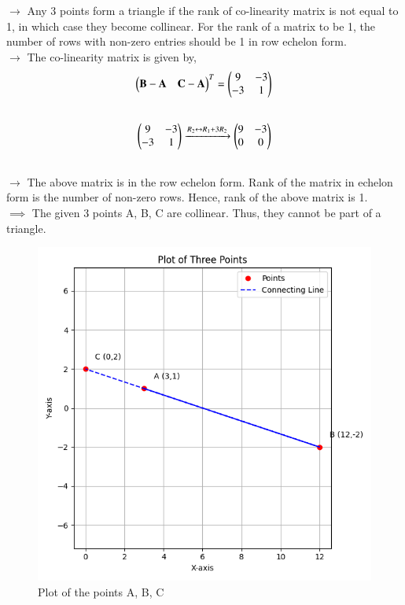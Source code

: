 \documentclass[journal]{IEEEtran}
\begin{document}
$\rightarrow$ Any 3 points form a triangle if the rank of co-linearity matrix is not equal to 1, in which case they become collinear. For the rank of a matrix to be 1, the number of rows with non-zero entries should be 1 in row echelon form. \\
$\rightarrow$ The co-linearity matrix is given by,
\begin{align}
\begin{pmatrix}\mathbf{B}-\mathbf{A} & \mathbf{C}-\mathbf{A}\end{pmatrix}^T = \begin{pmatrix}9 & -3 \\ -3 & 1\end{pmatrix}\\
\notag
\end{align}
\begin{align}
\begin{pmatrix}9 & -3 \\ -3 & 1\end{pmatrix}
&\xrightarrow{R_2 \leftrightarrow R_1 + 3R_2}
\begin{pmatrix}9 & -3 \\ 0 & 0\end{pmatrix}\\
\notag
\end{align}
$\rightarrow$ The above matrix is in the row echelon form. Rank of the matrix in echelon form is the number of non-zero rows. Hence, rank of the above matrix is 1.\\
$\implies$ The given 3 points A, B, C are collinear. Thus, they cannot be part of a triangle.
\begin{figure}[h!]
   \centering
   \includegraphics[width=0.5\linewidth]{figs/01.png}
   \caption{Plot of the points A, B, C}
   \label{Plot_1}
\end{figure}
\end{document}
